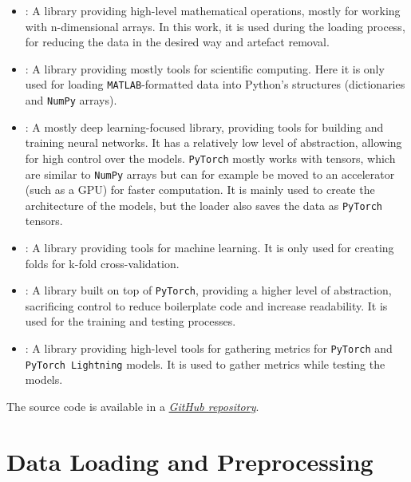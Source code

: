 \documentclass[english, he, bc, kiv, iso690alph, viewonly]{fasthesis}
\begin{document}
\begin{itemize}

\item{}: A library providing high-level mathematical operations, mostly for working with n-dimensional arrays. In this work, it is used during the loading process, for reducing the data in the desired way and artefact removal.

\item{}: A library providing mostly tools for scientific computing. Here it is only used for loading \texttt{MATLAB}-formatted data into Python's structures (dictionaries and \texttt{NumPy} arrays).

\item{}: A mostly deep learning-focused library, providing tools for building and training neural networks. It has a relatively low level of abstraction, allowing for high control over the models. \texttt{PyTorch} mostly works with tensors, which are similar to \texttt{NumPy} arrays but can for example be moved to an accelerator (such as a GPU) for faster computation. It is mainly used to create the architecture of the models, but the loader also saves the data as \texttt{PyTorch} tensors.

\item{}: A library providing tools for machine learning. It is only used for creating folds for k-fold cross-validation.

\item{}: A library built on top of \texttt{PyTorch}, providing a higher level of abstraction, sacrificing control to reduce boilerplate code and increase readability. It is used for the training and testing processes.

\item{}: A library providing high-level tools for gathering metrics for \texttt{PyTorch} and \texttt{PyTorch Lightning} models. It is used to gather metrics while testing the models.

\end{itemize}

The source code is available in a \href{https://github.com/radomirkesl/dleeg}{\textit{GitHub repository}}.

\section{Data Loading and Preprocessing}
\end{document}
